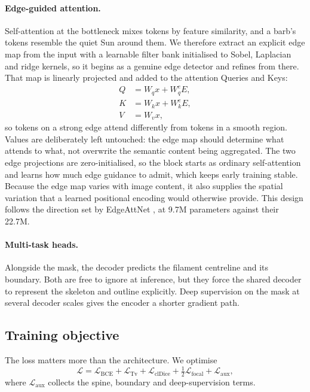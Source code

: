 \documentclass[11pt]{article}
\begin{document}
\paragraph{Edge-guided attention.}
Self-attention at the bottleneck \cite{attention2017} mixes tokens by feature
similarity, and a barb's tokens resemble the quiet Sun around them. We
therefore extract an explicit edge map from the input with a learnable filter
bank initialised to Sobel, Laplacian and ridge kernels, so it begins as a
genuine edge detector \cite{canny1986} and refines from there. That map is
linearly projected and added to the attention Queries and Keys:
%
\begin{align}
Q &= W_q x + W_{q}^{e} E, \\
K &= W_k x + W_{k}^{e} E, \\
V &= W_v x,
\end{align}
%
so tokens on a strong edge attend differently from tokens in a smooth region.
Values are deliberately left untouched: the edge map should determine what
attends to what, not overwrite the semantic content being aggregated. The two
edge projections are zero-initialised, so the block starts as ordinary
self-attention and learns how much edge guidance to admit, which keeps early
training stable. Because the edge map varies with image content, it also
supplies the spatial variation that a learned positional encoding would
otherwise provide. This design follows the direction set by EdgeAttNet
\cite{edgeattnet2025}, at 9.7M parameters against their 22.7M.

\paragraph{Multi-task heads.}
Alongside the mask, the decoder predicts the filament centreline and its
boundary. Both are free to ignore at inference, but they force the shared
decoder to represent the skeleton and outline explicitly. Deep supervision on
the mask at several decoder scales gives the encoder a shorter gradient path.

\subsection{Training objective}

The loss matters more than the architecture. We optimise
%
\begin{equation}
\mathcal{L} = \mathcal{L}_{\mathrm{BCE}} + \mathcal{L}_{\mathrm{Tv}}
  + \mathcal{L}_{\mathrm{clDice}} + \tfrac{1}{2}\mathcal{L}_{\mathrm{focal}}
  + \mathcal{L}_{\mathrm{aux}} ,
\end{equation}
%
where $\mathcal{L}_{\mathrm{aux}}$ collects the spine, boundary and
deep-supervision terms.
\end{document}
